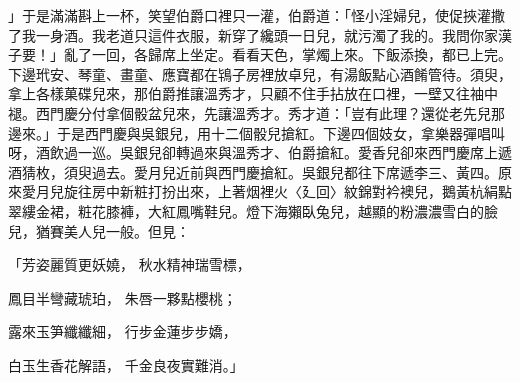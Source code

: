」于是滿滿斟上一杯，笑望伯爵口裡只一灌，伯爵道：「怪小淫婦兒，使促挾灌撒了我一身酒。我老道只這件衣服，新穿了纔頭一日兒，就污濁了我的。我問你家漢子要！」亂了一回，各歸席上坐定。看看天色，掌燭上來。下飯添換，都已上完。下邊玳安、琴童、畫童、應寶都在鴇子房裡放卓兒，有湯飯點心酒餚管待。須臾，拿上各樣菓碟兒來，那伯爵推讓溫秀才，只顧不住手拈放在口裡，一壁又往袖中褪。西門慶分付拿個骰盆兒來，先讓溫秀才。秀才道：「豈有此理？還從老先兒那邊來。」于是西門慶與吳銀兒，用十二個骰兒搶紅。下邊四個妓女，拿樂器彈唱叫呀，酒飲過一巡。吳銀兒卻轉過來與溫秀才、伯爵搶紅。愛香兒卻來西門慶席上遞酒猜枚，須臾過去。愛月兒近前與西門慶搶紅。吳銀兒都往下席遞李三、黃四。原來愛月兒旋往房中新粧打扮出來，上著烟裡火〈廴回〉紋錦對衿襖兒，鵝黃杭絹點翠縷金裙，粧花膝褲，大紅鳳嘴鞋兒。燈下海獺臥兔兒，越顯的粉濃濃雪白的臉兒，猶賽美人兒一般。但見：

「芳姿麗質更妖嬈，  秋水精神瑞雪標，

鳳目半彎藏琥珀，  朱唇一夥點櫻桃；

露來玉笋纖纖細，  行步金蓮步步嬌，

白玉生香花解語，  千金良夜實難消。」

